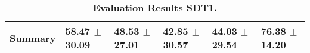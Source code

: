 \begin{table}[htb]
{\begin{tabular}{llllll}
\midrule
\textbf{Summary                                  } &                  \phantom{0}58.47 $\pm$ 30.09 &                      \phantom{0}48.53 $\pm$ 27.01 &            \phantom{0}42.85 $\pm$ 30.57 &                  \phantom{0}44.03 $\pm$ 29.54 &            \phantom{0}76.38 $\pm$ 14.20 \\
\bottomrule
\end{tabular}%
}
\caption{\textbf{Evaluation Results SDT1.}}
\label{tab:eval-results}
\end{table}


